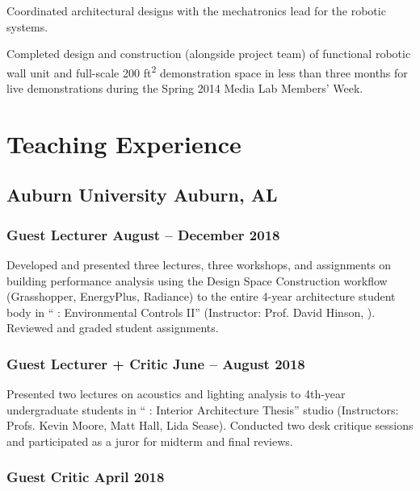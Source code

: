 \documentclass[letterpaper, oneside, 10pt]{article}
\begin{document}
Coordinated architectural designs with the mechatronics lead for the
robotic systems.

Completed design and construction (alongside project team) of functional
robotic wall unit and full-scale 200 ft\textsuperscript{2} demonstration
space in less than three months for live demonstrations during the Spring
2014  Media Lab Members’ Week.



\section*{Teaching Experience} %

\hfill
\vspace{-25pt}


\subsection*{Auburn University\DotSep{0.25em} Auburn, AL}


\subsubsection*{Guest Lecturer\DotSep{0.25em} August -- December 2018}

Developed and presented three lectures, three workshops, and assignments on
building performance analysis using the Design Space Construction workflow
(Grasshopper, EnergyPlus, Radiance) to the entire 4-year architecture
student body in `` : Environmental Controls II” (Instructor:
Prof. David Hinson, ). Reviewed and graded student assignments.


\subsubsection*{Guest Lecturer + Critic\DotSep{0.25em} June – August 2018}

Presented two lectures on acoustics and lighting analysis to 4th-year
undergraduate students in `` : Interior Architecture
Thesis'' studio (Instructors: Profs. Kevin Moore, Matt Hall, Lida Sease).
Conducted two desk critique sessions and participated as a juror for midterm
and final reviews.


\subsubsection*{Guest Critic\DotSep{0.25em} April 2018}
\end{document}
